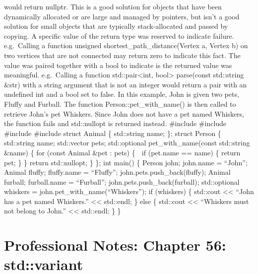 would return nullptr. This is a good solution for objects that have been
dynamically allocated or are large and managed by pointers, but isn't a
good solution for small objects that are typically stack-allocated and
passed by copying. A speciﬁc value of the return type was reserved to
indicate failure. e.g.~Calling a function unsigned
shortest\_path\_distance(Vertex a, Vertex b) on two vertices that are
not connected may return zero to indicate this fact. The value was
paired together with a bool to indicate is the returned value was
meaningful. e.g.~Calling a function std::pair\textless int,
bool\textgreater{} parse(const std::string \&str) with a string argument
that is not an integer would return a pair with an undeﬁned int and a
bool set to false. In this example, John is given two pets, Fluﬀy and
Furball. The function Person::pet\_with\_name() is then called to
retrieve John's pet Whiskers. Since John does not have a pet named
Whiskers, the function fails and std::nullopt is returned instead.
\#include \#include \#include \#include struct Animal \{ std::string
name; \}; struct Person \{ std::string name; std::vector pets;
std::optional pet\_with\_name(const std::string \&name) \{ for (const
Animal \&pet : pets) \{  if (pet.name == name) \{ return pet; \} \}
return std::nullopt; \} \}; int main() \{ Person john; john.name =
``John''; Animal fluffy; fluffy.name = ``Fluffy'';
john.pets.push\_back(fluffy); Animal furball; furball.name =
``Furball''; john.pets.push\_back(furball); std::optional whiskers =
john.pet\_with\_name(``Whiskers''); if (whiskers) \{ std::cout
\textless\textless{} ``John has a pet named Whiskers.''
\textless\textless{} std::endl; \} else \{ std::cout
\textless\textless{} ``Whiskers must not belong to John.''
\textless\textless{} std::endl; \} \}

\hypertarget{professional-notes-chapter-56-stdvariant-1}{%
\chapter{Professional Notes: Chapter 56:
std::variant}\label{professional-notes-chapter-56-stdvariant-1}}

